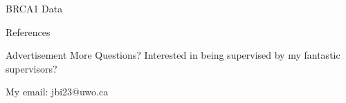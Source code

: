 \documentclass [aspectratio=169]{beamer}
\begin{document}
\begin{frame}{BRCA1 Data} 

    \begin{table}[]
    \caption{The Application Results for BRCA1 family data with 80\% missing rate on "PRS" variable using Gamma frailty model, with 498 families and 2650 individuals. $M=5$, * denotes a $p<0.05$. }
    \end{table}
\end{frame}

\begin{frame}[t,allowframebreaks]{References}
    
    
\end{frame}

\begin{frame}{Advertisement}
    More Questions? Interested in being supervised by my fantastic supervisors? 

    My email: jbi23@uwo.ca
\end{frame}
\end{document}
